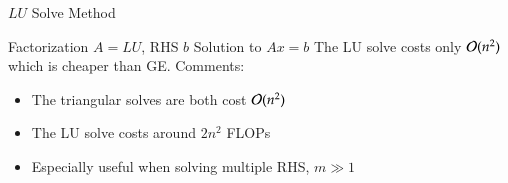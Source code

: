 \documentclass[10pt]{beamer}
\begin{document}
\begin{frame}{$LU$ Solve Method}

{Factorization $A=LU$, RHS $b$}
{Solution to $Ax=b$}
{The LU solve costs only ${\mathcal{O}}(n^2)$ which is cheaper than GE.}
\vspace{3mm}
Comments:
\begin{itemize}
    \item The triangular solves are both cost ${\mathcal{O}}(n^2)$
    \item The LU solve costs around $2n^2$ FLOPs
    \item Especially useful when solving multiple RHS, $m\gg1$
\end{itemize}


\end{frame}


\end{document}
